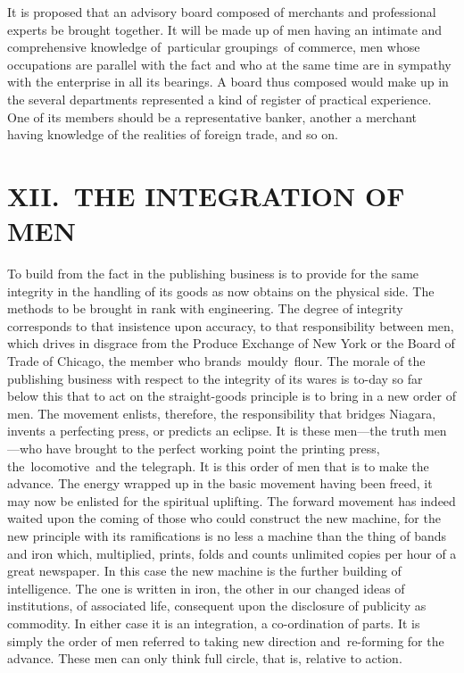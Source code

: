 \documentclass[twoside,symmetric,nobib,justified]{tufte-book}
\begin{document}
It is proposed that an advisory board composed of merchants and
professional experts be brought together. It will be made up of men
having an intimate and comprehensive knowledge of~particular
groupings~of commerce, men whose occupations are parallel with the fact
and who at the same time are in sympathy with the enterprise in all its
bearings. A board thus composed would make up in the several departments
represented a kind of register of practical experience. One of its
members should be a representative banker, another a merchant having
knowledge of the realities of foreign trade, and so on.~~

\hypertarget{xii-the-integration-of-men}{%
\section{XII.~THE INTEGRATION OF
MEN}\label{xii-the-integration-of-men}}

To build from the fact in the publishing business is to provide for the
same integrity in the handling of its goods as now obtains on the
physical side. The methods to be brought in rank with engineering. The
degree of integrity corresponds to that insistence upon accuracy, to
that responsibility between men, which drives in disgrace from the
Produce Exchange of New York or the Board of Trade of Chicago, the
member who brands~mouldy~flour. The morale of the publishing business
with respect to the integrity of its wares is to-day so far below this
that to act on the straight-goods principle is to bring in a new order
of men. The movement enlists, therefore, the responsibility that bridges
Niagara, invents a perfecting press, or predicts an eclipse. It is these
men---the truth men---who have brought to the perfect working point the
printing press, the~locomotive~and the telegraph. It is this order of
men that is to make the advance. The energy wrapped up in the basic
movement having been freed, it may now be enlisted for the spiritual
uplifting. The forward movement has indeed waited upon the coming of
those who could construct the new machine, for the new principle with
its ramifications is no less a machine than the thing of bands and iron
which, multiplied, prints, folds and counts unlimited copies per hour of
a great newspaper. In this case the new machine is the further building
of intelligence. The one is written in iron, the other in our changed
ideas of institutions, of associated life, consequent upon the
disclosure of publicity as commodity. In either case it is an
integration, a co-ordination of parts. It is simply the order of men
referred to taking new direction and~re-forming for the advance. These
men can only think full circle, that is, relative to action.~
\end{document}
